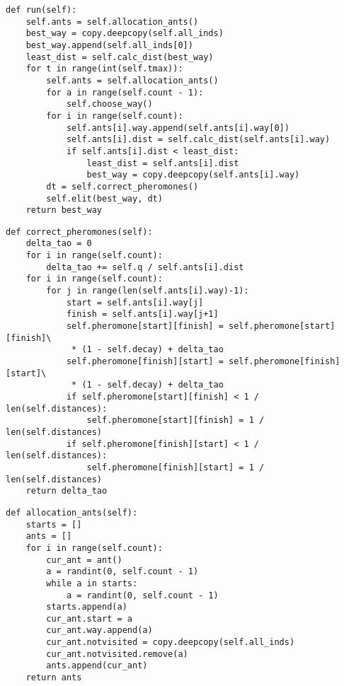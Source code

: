\begin{lstlisting}[caption=Муравьиный алгоритм]
def run(self):
	self.ants = self.allocation_ants()
	best_way = copy.deepcopy(self.all_inds)
	best_way.append(self.all_inds[0])
	least_dist = self.calc_dist(best_way)
	for t in range(int(self.tmax)):
		self.ants = self.allocation_ants()
		for a in range(self.count - 1):
			self.choose_way()
		for i in range(self.count):
			self.ants[i].way.append(self.ants[i].way[0])
			self.ants[i].dist = self.calc_dist(self.ants[i].way)
			if self.ants[i].dist < least_dist:
				least_dist = self.ants[i].dist
				best_way = copy.deepcopy(self.ants[i].way)
		dt = self.correct_pheromones()
		self.elit(best_way, dt)
	return best_way
\end{lstlisting}

\begin{lstlisting}[caption=Функция корректировки ферамонов]
def correct_pheromones(self):
	delta_tao = 0
	for i in range(self.count):
		delta_tao += self.q / self.ants[i].dist
	for i in range(self.count):
		for j in range(len(self.ants[i].way)-1):
			start = self.ants[i].way[j]
			finish = self.ants[i].way[j+1]
			self.pheromone[start][finish] = self.pheromone[start][finish]\
			 * (1 - self.decay) + delta_tao
			self.pheromone[finish][start] = self.pheromone[finish][start]\
			 * (1 - self.decay) + delta_tao
			if self.pheromone[start][finish] < 1 / len(self.distances):
				self.pheromone[start][finish] = 1 / len(self.distances)
			if self.pheromone[finish][start] < 1 / len(self.distances):
				self.pheromone[finish][start] = 1 / len(self.distances)
	return delta_tao
\end{lstlisting}

\begin{lstlisting}[caption=Функция распределения муравьёв по случайным городам]
def allocation_ants(self):
	starts = []
	ants = []
	for i in range(self.count):
		cur_ant = ant()
		a = randint(0, self.count - 1)
		while a in starts:
			a = randint(0, self.count - 1)
		starts.append(a)
		cur_ant.start = a
		cur_ant.way.append(a)
		cur_ant.notvisited = copy.deepcopy(self.all_inds)
		cur_ant.notvisited.remove(a)
		ants.append(cur_ant)
	return ants
\end{lstlisting}

